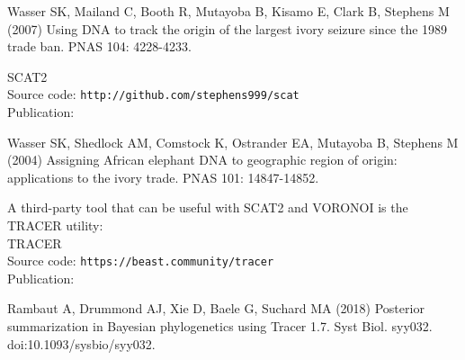 \documentclass[10pt,titlepage,times,letterpaper]{article}
\begin{document}
Wasser SK, Mailand C, Booth R, Mutayoba B, Kisamo E, Clark B, Stephens M (2007)
Using DNA to track the origin of the largest ivory seizure since the 1989 trade ban.
PNAS 104: 4228-4233.


SCAT2 \\ 
Source code:  {\tt http://github.com/stephens999/scat} \\
Publication:

Wasser SK, Shedlock AM, Comstock K, Ostrander EA, Mutayoba B, Stephens M (2004)
Assigning African elephant DNA to geographic region of origin:  applications
to the ivory trade.  PNAS 101: 14847-14852.

A third-party tool that can be useful with SCAT2 and VORONOI is the TRACER utility: \\

TRACER \\ 
Source code: {\tt https://beast.community/tracer } \\
Publication:

Rambaut A, Drummond AJ, Xie D, Baele G, Suchard MA (2018)  Posterior summarization in Bayesian
phylogenetics using Tracer 1.7.  Syst Biol.  syy032.  doi:10.1093/sysbio/syy032.
\end{document}
